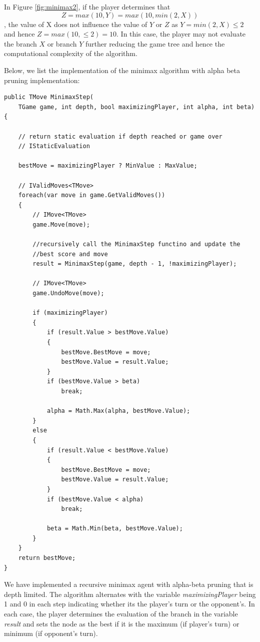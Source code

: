 In Figure \ref{fig:minimax2}, if the player determines that 
\begin{equation}
    Z = max (10, Y) = max (10,  min (2, X))
\end{equation}
, the value of X does not influence the value of $Y$ or $Z$ as $Y = min(2, X) \leq 2$ and hence $Z = max(10, \leq 2) = 10$. In this case, the player may not evaluate the branch $X$ or branch $Y$ further reducing the game tree and hence the computational complexity of the algorithm. 

Below, we list the implementation of the minimax algorithm with alpha beta pruning implementation:

\begin{lstlisting}
public TMove MinimaxStep(
    TGame game, int depth, bool maximizingPlayer, int alpha, int beta) {
    
    // return static evaluation if depth reached or game over
    // IStaticEvaluation

    bestMove = maximizingPlayer ? MinValue : MaxValue;
    
    // IValidMoves<TMove>
    foreach(var move in game.GetValidMoves())
    {
        // IMove<TMove>
        game.Move(move);

        //recursively call the MinimaxStep functino and update the
        //best score and move
        result = MinimaxStep(game, depth - 1, !maximizingPlayer);
        
        // IMove<TMove>
        game.UndoMove(move);

        if (maximizingPlayer)
        {
            if (result.Value > bestMove.Value)
            {
                bestMove.BestMove = move;
                bestMove.Value = result.Value;
            }
            if (bestMove.Value > beta)
                break;

            alpha = Math.Max(alpha, bestMove.Value);
        }
        else
        {
            if (result.Value < bestMove.Value)
            {
                bestMove.BestMove = move;
                bestMove.Value = result.Value;
            }
            if (bestMove.Value < alpha)
                break;

            beta = Math.Min(beta, bestMove.Value);
        }
    }
    return bestMove;
}
\end{lstlisting}

We have implemented a recursive minimax agent with alpha-beta pruning that is depth limited. The algorithm alternates with the variable \textit{maximizingPlayer} being 1 and 0 in each step indicating whether its the player's turn or the opponent's. In each case, the player determines the evaluation of the branch in the variable \textit{result} and sets the node as the best if it is the maximum (if player's turn) or minimum (if opponent's turn).

